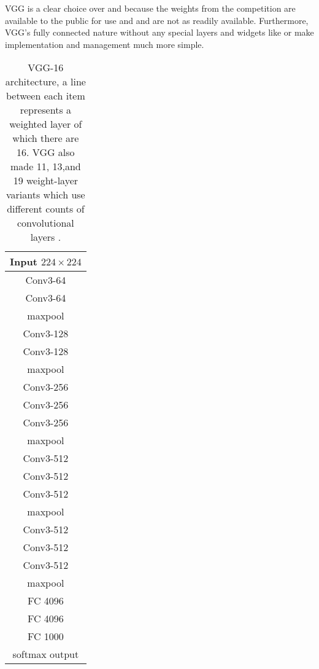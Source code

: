 VGG is a clear choice over \gnet and \anet because the weights from the competition are available to the public for use and \anet and \gnet are not as readily available. Furthermore, VGG's fully connected nature without any special layers and widgets like \anet or \gnet make implementation and management much more simple. %

\begin{table}
    \begin{center}
        \begin{tabular}{| c |}
        \hline
        Input $224 \times 224$ \\
        \hline
        Conv3-64 \\
        Conv3-64 \\
        \hline
        maxpool\\
        \hline
        Conv3-128 \\
        Conv3-128 \\
        \hline
        maxpool \\
        \hline
        Conv3-256 \\
        Conv3-256 \\
        Conv3-256 \\
        \hline
        maxpool \\
        \hline
        Conv3-512 \\
        Conv3-512 \\
        Conv3-512 \\
        \hline
        maxpool \\
        \hline
        Conv3-512 \\
        Conv3-512 \\
        Conv3-512 \\
        \hline
        maxpool\\
        \hline
        FC 4096\\
        \hline
        FC 4096\\
        \hline
        FC 1000\\
        \hline
        softmax output\\
        \hline
        \end{tabular}
        \caption{VGG-16 architecture, a line between each item represents a weighted layer of which there are 16. VGG also made 11, 13,and 19 weight-layer variants which use different counts of convolutional layers \cite{vgg16-arxiv}.}
    \end{center}
\end{table}

